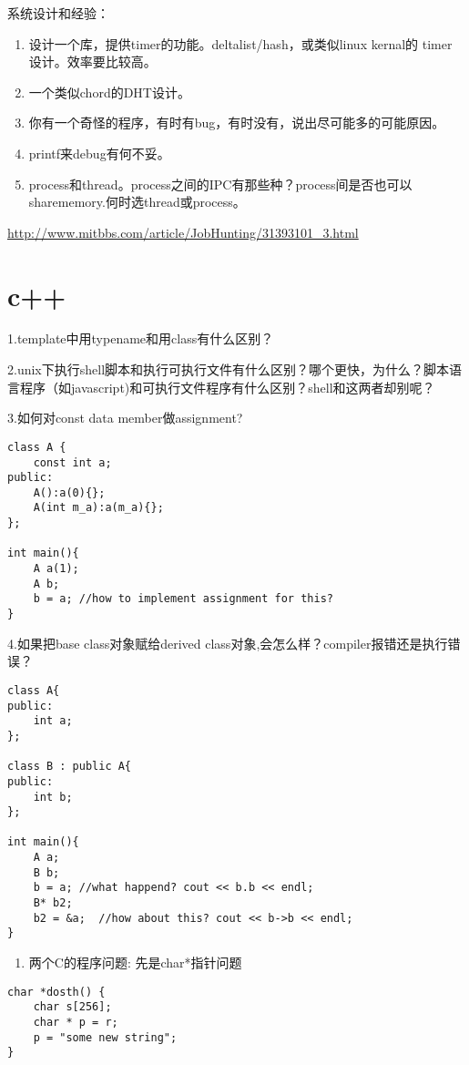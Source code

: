 \documentclass[12pt]{book}
\begin{document}
系统设计和经验：
\begin{enumerate}
\item 设计一个库，提供timer的功能。deltalist/hash，或类似linux kernal的 timer 设计。效率要比较高。
\item 一个类似chord的DHT设计。
\item 你有一个奇怪的程序，有时有bug，有时没有，说出尽可能多的可能原因。
\item printf来debug有何不妥。
\item process和thread。process之间的IPC有那些种？process间是否也可以sharememory.何时选thread或process。
\end{enumerate}
\url{http://www.mitbbs.com/article/JobHunting/31393101_3.html}

\chapter{c++}
\label{sec-10}
1.template中用typename和用class有什么区别？

2.unix下执行shell脚本和执行可执行文件有什么区别？哪个更快，为什么？脚本语言程序（如javascript)和可执行文件程序有什么区别？shell和这两者却别呢？

3.如何对const data member做assignment?
\lstset{language=java,label= ,caption= ,numbers=none}
\begin{lstlisting}
class A {
    const int a;
public:
    A():a(0){};
    A(int m_a):a(m_a){};
};

int main(){
    A a(1);
    A b;
    b = a; //how to implement assignment for this?
}
\end{lstlisting}

4.如果把base class对象赋给derived class对象,会怎么样？compiler报错还是执行错
误？
\lstset{language=java,label= ,caption= ,numbers=none}
\begin{lstlisting}
class A{
public:
    int a;
};

class B : public A{
public:
    int b;
};

int main(){
    A a;
    B b;
    b = a; //what happend? cout << b.b << endl;    
    B* b2;
    b2 = &a;  //how about this? cout << b->b << endl; 
}
\end{lstlisting}

\begin{enumerate}
\item 两个C的程序问题: 先是char*指针问题
\end{enumerate}
\lstset{language=java,label= ,caption= ,numbers=none}
\begin{lstlisting}
char *dosth() {
    char s[256];
    char * p = r;
    p = "some new string";
}
\end{lstlisting}
\end{document}
